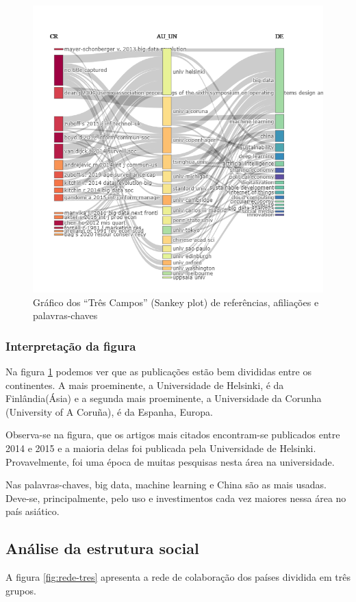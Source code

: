 \begin{figure}[ht]
    \centering
    \includegraphics[width=12cm]{experiments/Tong00020/PesquisaBibliometrica/DataSet/MASSA@Tong00020-Three Fields Plot Affiliations References Keywords.png}
    \caption{Gráfico dos “Três Campos” (Sankey plot) de referências, afiliações e palavras-chaves}
    \label{fig:g-tres}
\end{figure}

\subsubsection{Interpretação da figura}
Na figura \ref{fig:g-tres} podemos ver que as publicações estão bem divididas entre os continentes. A mais proeminente, a Universidade de Helsinki, é da Finlândia(Ásia) e a segunda mais proeminente, a Universidade da Corunha (University of A Coruña), é da Espanha, Europa.

Observa-se na figura, que os artigos mais citados encontram-se publicados entre 2014 e 2015 e a maioria delas foi publicada pela Universidade de Helsinki. Provavelmente, foi uma época de muitas pesquisas nesta área na universidade.

Nas palavras-chaves, big data, machine learning e China são as mais usadas. Deve-se, principalmente, pelo uso e investimentos cada vez maiores nessa área no país asiático.


\subsection{Análise da estrutura social}
A figura \ref{fig:rede-tres} apresenta a rede de colaboração dos países dividida em três grupos. 

